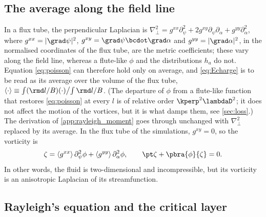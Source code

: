\subsection{The average along the field line}\label{app:rayleigh_metric}

In a flux tube, the perpendicular Laplacian is \(\nabla_\perp^2 = g^{xx}\partial_\psi^2 + 2g^{xy}\partial_\psi\partial_\alpha + g^{yy}\partial_\alpha^2\), where \(g^{xx} = |\grad\psi|^2\), \(g^{xy} = \grad\psi\bcdot\grad\alpha\) and \(g^{yy} = |\grad\alpha|^2\), in the normalised coordinates of the flux tube, are the metric coefficients; these vary along the field line, whereas a flute-like \(\phi\) and the distributions \(h_a\) do not. Equation \cref{eq:poisson} can therefore hold only on average, and \cref{eq:Echarge} is to be read as its average over the volume of the flux tube, \(\langle\cdot\rangle\equiv\int(\rmd l/B)(\cdot)\big/\!\int\rmd l/B\). (The departure of \(\phi\) from a flute-like function that restores \cref{eq:poisson} at every \(l\) is of relative order \(\kperp^2\lambdaD^2\); it does not affect the motion of the vortices, but it is what damps them, see \cref{sec:loss}.) The derivation of \cref{app:rayleigh_moment} goes through unchanged with \(\nabla_\perp^2\) replaced by its average. In the flux tube of the simulations, \(g^{xy} = 0\), so the vorticity is
\begin{equation}
\zeta = \langle g^{xx}\rangle\,\partial_\psi^2\phi + \langle g^{yy}\rangle\,\partial_\alpha^2\phi,
\qquad
\pt\zeta + \pbra{\phi}{\zeta} = 0.
\label{eq:Evorticity}
\end{equation}
In other words, the fluid is two-dimensional and incompressible, but its vorticity is an anisotropic Laplacian of its streamfunction.

\subsection{Rayleigh's equation and the critical layer}\label{app:rayleigh_equation}

